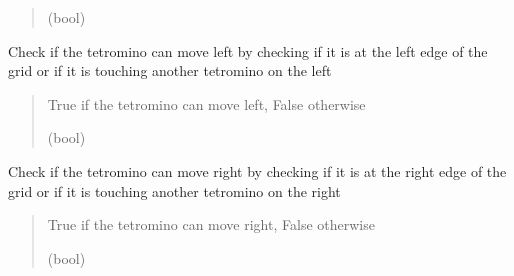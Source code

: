 \documentclass[letterpaper,10pt,english]{sphinxmanual}
\begin{document}
\begin{fulllineitems}
\begin{fulllineitems}
\begin{quote}
\begin{description}
\sphinxAtStartPar
(bool)

\end{description}\end{quote}

\end{fulllineitems}


\begin{fulllineitems}
\label{\detokenize{tetris.tetrominos:tetris.tetrominos.Tetromino.check_move_left}}
\pysigstartsignatures
{}
\pysigstopsignatures
\sphinxAtStartPar
Check if the tetromino can move left by checking if it is at the left edge of the grid or if it is touching another tetromino on the left
\begin{quote}\begin{description}
\sphinxAtStartPar
True if the tetromino can move left, False otherwise

\sphinxAtStartPar
(bool)

\end{description}\end{quote}

\end{fulllineitems}


\begin{fulllineitems}
\label{\detokenize{tetris.tetrominos:tetris.tetrominos.Tetromino.check_move_right}}
\pysigstartsignatures
{}
\pysigstopsignatures
\sphinxAtStartPar
Check if the tetromino can move right by checking if it is at the right edge of the grid or if it is touching another tetromino on the right
\begin{quote}\begin{description}
\sphinxAtStartPar
True if the tetromino can move right, False otherwise

\sphinxAtStartPar
(bool)

\end{description}\end{quote}


\end{fulllineitems}
\end{fulllineitems}
\end{document}
